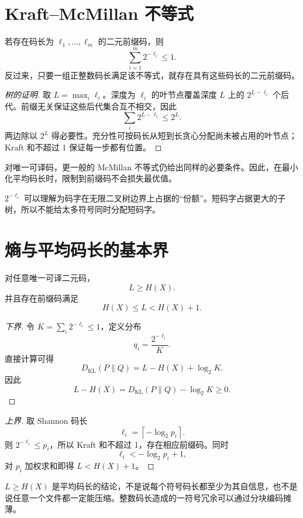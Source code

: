 \section{Kraft--McMillan 不等式}

\begin{theorem}
若存在码长为 $\ell_1,\dots,\ell_m$ 的二元前缀码，则
\[
\sum_{i=1}^m 2^{-\ell_i}\le1.
\]
反过来，只要一组正整数码长满足该不等式，就存在具有这些码长的二元前缀码。
\end{theorem}

\begin{proof}[树的证明]
取 $L=\max_i\ell_i$。深度为 $\ell_i$ 的叶节点覆盖深度 $L$ 上的 $2^{L-\ell_i}$ 个后代。前缀无关保证这些后代集合互不相交，因此
\[
\sum_i2^{L-\ell_i}\le2^L.
\]
两边除以 $2^L$ 得必要性。充分性可按码长从短到长贪心分配尚未被占用的叶节点；Kraft 和不超过 1 保证每一步都有位置。
\end{proof}

对唯一可译码，更一般的 McMillan 不等式仍给出同样的必要条件。因此，在最小化平均码长时，限制到前缀码不会损失最优值。

\begin{intuitionbox}
$2^{-\ell_i}$ 可以理解为码字在无限二叉树边界上占据的“份额”。短码字占据更大的子树，所以不能给太多符号同时分配短码字。
\end{intuitionbox}

\section{熵与平均码长的基本界}

\begin{theorem}[无失真一符号编码界]
对任意唯一可译二元码，
\[
L\ge H(X).
\]
并且存在前缀码满足
\[
H(X)\le L < H(X)+1.
\]
\end{theorem}

\begin{proof}[下界]
令 $K=\sum_i2^{-\ell_i}\le1$，定义分布
\[
q_i=\frac{2^{-\ell_i}}{K}.
\]
直接计算可得
\[
D_{\mathrm{KL}}(P\|Q)=L-H(X)+\log_2K.
\]
因此
\[
L-H(X)=D_{\mathrm{KL}}(P\|Q)-\log_2K\ge0.
\]
\end{proof}

\begin{proof}[上界]
取 Shannon 码长
\[
\ell_i=\left\lceil-\log_2p_i\right\rceil.
\]
则 $2^{-\ell_i}\le p_i$，所以 Kraft 和不超过 1，存在相应前缀码。同时
\[
\ell_i<-\log_2p_i+1,
\]
对 $p_i$ 加权求和即得 $L<H(X)+1$。
\end{proof}

\begin{warningbox}
$L\ge H(X)$ 是平均码长的结论，不是说每个符号码长都至少为其自信息，也不是说任意一个文件都一定能压缩。整数码长造成的一符号冗余可以通过分块编码摊薄。
\end{warningbox}

